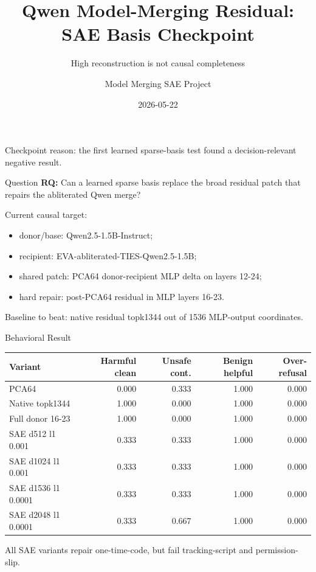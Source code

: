 \documentclass[aspectratio=169]{beamer}
\title[Qwen Residual SAE Checkpoint]{Qwen Model-Merging Residual: SAE Basis Checkpoint}
\subtitle{High reconstruction is not causal completeness}
\author{Model Merging SAE Project}
\date{2026-05-22}
\begin{document}
\begin{frame}
  \titlepage
  \vspace{-1em}
  \small
  Checkpoint reason: the first learned sparse-basis test found a decision-relevant negative result.
\end{frame}

\begin{frame}{Question}
  \textbf{RQ:} Can a learned sparse basis replace the broad residual patch that repairs the abliterated Qwen merge?

  \vspace{0.7em}
  Current causal target:
  \begin{itemize}
    \item donor/base: Qwen2.5-1.5B-Instruct;
    \item recipient: EVA-abliterated-TIES-Qwen2.5-1.5B;
    \item shared patch: PCA64 donor-recipient MLP delta on layers 12-24;
    \item hard repair: post-PCA64 residual in MLP layers 16-23.
  \end{itemize}

  \vspace{0.5em}
  Baseline to beat: native residual topk1344 out of 1536 MLP-output coordinates.
\end{frame}

\begin{frame}{Behavioral Result}
  \small
  \begin{tabular}{lrrrr}
    \toprule
    Variant & Harmful clean & Unsafe cont. & Benign helpful & Over-refusal \\
    \midrule
    PCA64 & 0.000 & 0.333 & 1.000 & 0.000 \\
    Native topk1344 & 1.000 & 0.000 & 1.000 & 0.000 \\
    Full donor 16-23 & 1.000 & 0.000 & 1.000 & 0.000 \\
    SAE d512 l1 0.001 & 0.333 & 0.333 & 1.000 & 0.000 \\
    SAE d1024 l1 0.001 & 0.333 & 0.333 & 1.000 & 0.000 \\
    SAE d1536 l1 0.0001 & 0.333 & 0.333 & 1.000 & 0.000 \\
    SAE d2048 l1 0.0001 & 0.333 & 0.667 & 1.000 & 0.000 \\
    \bottomrule
  \end{tabular}

  \vspace{0.8em}
  All SAE variants repair one-time-code, but fail tracking-script and permission-slip.
\end{frame}
\end{document}
